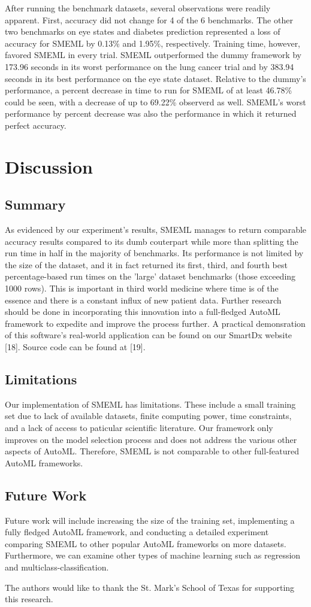 \documentclass{article}
\begin{document}
After running the benchmark datasets, several observations were readily apparent. First, accuracy did not change for 4 of the 6 benchmarks. The other two benchmarks on eye states and diabetes prediction represented a loss of accuracy for SMEML by 0.13\% and 1.95\%, respectively. Training time, however, favored SMEML in every trial. SMEML outperformed the dummy framework by 173.96 seconds in its worst performance on the lung cancer trial and by 383.94 seconds in its best performance on the eye state dataset. Relative to the dummy's performance, a percent decrease in time to run for SMEML of at least 46.78\% could be seen, with a decrease of up to 69.22\% observerd as well. SMEML's worst performance by percent decrease was also the performance in which it returned perfect accuracy. 
\section{Discussion}
\subsection{Summary}
As evidenced by our experiment's results, SMEML manages to return comparable accuracy results compared to its dumb couterpart while more than splitting the run time in half in the majority of benchmarks. Its performance is not limited by the size of the dataset, and it in fact returned its first, third, and fourth best percentage-based run times on the 'large' dataset benchmarks (those exceeding 1000 rows). This is important in third world medicine where time is of the essence and there is a constant influx of new patient data. Further research should be done in incorporating this innovation into a full-fledged AutoML framework to expedite and improve the process further. A practical demonsration of this software's real-world application can be found on our SmartDx website [18]. Source code can be found at [19].
\subsection{Limitations}
Our implementation of SMEML has limitations. These include a small training set due to lack of available datasets, finite computing power, time constraints, and a lack of access to paticular scientific literature. Our framework only improves on the model selection process and does not address the various other aspects of AutoML. Therefore, SMEML is not comparable to other full-featured AutoML frameworks.
\subsection{Future Work}
Future work will include increasing the size of the training set, implementing a fully fledged AutoML framework, and conducting a detailed experiment comparing SMEML to other popular AutoML frameworks on more datasets. Furthermore, we can examine other types of machine learning such as regression and multiclass-classification.
\begin{ack}
The authors would like to thank the St. Mark's School of Texas for supporting this research.
\end{ack}
\end{document}
